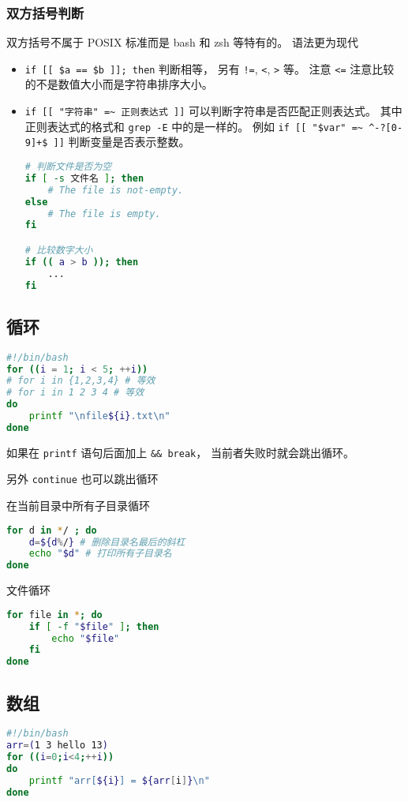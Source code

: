 \subsubsection{双方括号判断}

双方括号不属于 POSIX 标准而是 bash 和 zsh 等特有的。 语法更为现代
\begin{itemize}
\item \verb`if [[ $a == $b ]]; then` 判断相等， 另有 \verb`!=`, \verb`<`, \verb`>` 等。 注意 \verb`<=` 注意比较的不是数值大小而是字符串排序大小。
\item \verb`if [[ "字符串" =~ 正则表达式 ]]` 可以判断字符串是否匹配正则表达式。 其中正则表达式的格式和 \verb`grep -E` 中的是一样的。 例如 \verb`if [[ "$var" =~ ^-?[0-9]+$ ]]` 判断变量是否表示整数。
\begin{lstlisting}[language=bash]
# 判断文件是否为空
if [ -s 文件名 ]; then
    # The file is not-empty.
else
    # The file is empty.
fi

# 比较数字大小
if (( a > b )); then
    ...
fi
\end{lstlisting}
\end{itemize}

\subsection{循环}
\begin{lstlisting}[language=bash]
#!/bin/bash
for ((i = 1; i < 5; ++i))
# for i in {1,2,3,4} # 等效
# for i in 1 2 3 4 # 等效
do
	printf "\nfile${i}.txt\n"
done
\end{lstlisting}
如果在 \verb`printf` 语句后面加上 \verb`&& break`， 当前者失败时就会跳出循环。

另外 \verb`continue` 也可以跳出循环

在当前目录中所有子目录循环
\begin{lstlisting}[language=bash]
for d in */ ; do
    d=${d%/} # 删除目录名最后的斜杠
    echo "$d" # 打印所有子目录名
done
\end{lstlisting}
文件循环
\begin{lstlisting}[language=bash]
for file in *; do
    if [ -f "$file" ]; then
        echo "$file"
    fi
done
\end{lstlisting}

\subsection{数组}
\begin{lstlisting}[language=bash]
#!/bin/bash
arr=(1 3 hello 13)
for ((i=0;i<4;++i))
do
    printf "arr[${i}] = ${arr[i]}\n"
done
\end{lstlisting}


